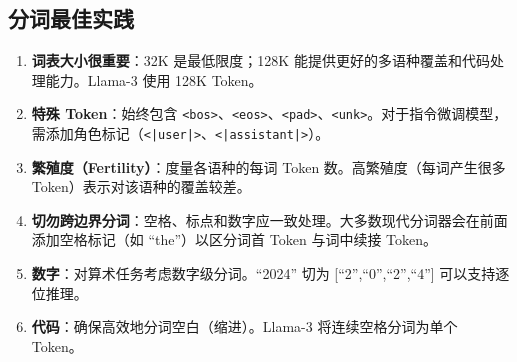 \subsection{分词最佳实践}
\label{tokenization-best-practices}

\begin{enumerate}
  \item \textbf{词表大小很重要}：32K 是最低限度；128K 能提供更好的多语种覆盖和代码处理能力。Llama-3 使用 128K Token。
  \item \textbf{特殊 Token}：始终包含 \texttt{<bos>}、\texttt{<eos>}、\texttt{<pad>}、\texttt{<unk>}。对于指令微调模型，需添加角色标记（\texttt{<|user|>}、\texttt{<|assistant|>}）。
  \item \textbf{繁殖度（Fertility）}：度量各语种的每词 Token 数。高繁殖度（每词产生很多 Token）表示对该语种的覆盖较差。
  \item \textbf{切勿跨边界分词}：空格、标点和数字应一致处理。大多数现代分词器会在前面添加空格标记（如 ``the''）以区分词首 Token 与词中续接 Token。
  \item \textbf{数字}：对算术任务考虑数字级分词。``2024'' 切为 [``2'',``0'',``2'',``4''] 可以支持逐位推理。
  \item \textbf{代码}：确保高效地分词空白（缩进）。Llama-3 将连续空格分词为单个 Token。
\end{enumerate}

